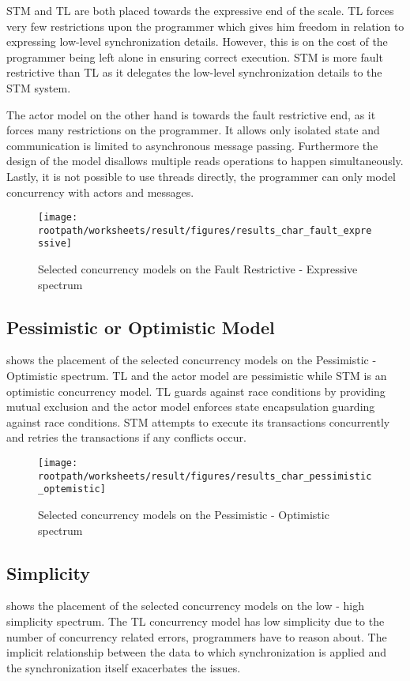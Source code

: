 \ac{STM} and \ac{TL} are both placed towards the expressive end of the scale. \ac{TL} forces very few restrictions upon the programmer which gives him freedom in relation to expressing low-level synchronization details. However, this is on the cost of the programmer being left alone in ensuring correct execution. \ac{STM} is more fault restrictive than \ac{TL} as it delegates the low-level synchronization details to the STM system. 

The actor model on the other hand is towards the fault restrictive end, as it forces many restrictions on the programmer. It allows only isolated state and communication is limited to asynchronous message passing. Furthermore the design of the model disallows multiple reads operations to happen simultaneously. Lastly, it is not possible to use threads directly, the programmer can only model concurrency with actors and messages.

\begin{figure}[htbp]
\centering
 \texttt{[image: \\rootpath/worksheets/result/figures/results\_char\_fault\_expressive]} 
 \caption{Selected concurrency models on the Fault Restrictive - Expressive spectrum}
\label{fig:results_char_fault_expressive}
\end{figure}

\subsection{Pessimistic or Optimistic Model}
 shows the placement of the selected concurrency models on the Pessimistic - Optimistic spectrum. \ac{TL} and the actor model are pessimistic while \ac{STM} is an optimistic concurrency model. \ac{TL} guards against race conditions by providing mutual exclusion and the actor model enforces state encapsulation guarding against race conditions. \ac{STM} attempts to execute its transactions concurrently and retries the transactions if any conflicts occur.

\begin{figure}[htbp]
\centering
 \texttt{[image: \\rootpath/worksheets/result/figures/results\_char\_pessimistic\_optemistic]} 
 \caption{Selected concurrency models on the Pessimistic - Optimistic spectrum}
\label{fig:results_char_pes_opti}
\end{figure}

\subsection{Simplicity}
 shows the placement of the selected concurrency models on the low - high simplicity spectrum. The \ac{TL} concurrency model has low simplicity due to the number of concurrency related errors, programmers have to reason about. The implicit relationship between the data to which synchronization is applied and the synchronization itself exacerbates the issues.

